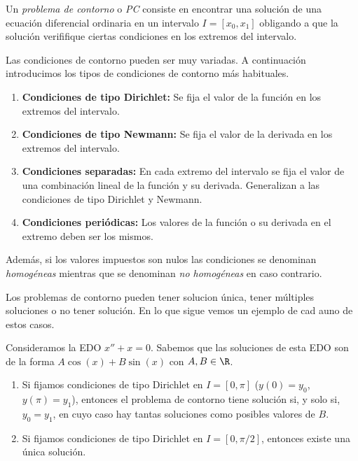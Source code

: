 \documentclass{article}
\begin{document}
\begin{definition}
  Un \emph{problema de contorno} o \emph{PC} consiste en encontrar una solución de una ecuación
  diferencial ordinaria en un intervalo $I = [x_0, x_1]$ obligando a que la solución verififique
  ciertas condiciones en los extremos del intervalo.
\end{definition}

Las condiciones de contorno pueden ser muy variadas. A continuación introducimos los tipos de
condiciones de contorno más habituales.

\begin{enumerate}
\item \textbf{Condiciones de tipo Dirichlet:} Se fija el valor de la función en los extremos del
  intervalo.
\item \textbf{Condiciones de tipo Newmann:} Se fija el valor de la derivada en los extremos del
  intervalo.
\item \textbf{Condiciones separadas:} En cada extremo del intervalo se fija el valor de una
  combinación lineal de la función y su derivada. Generalizan a las condiciones de tipo Dirichlet y
  Newmann.
\item \textbf{Condiciones periódicas:} Los valores de la función o su derivada en el extremo deben
  ser los mismos.
\end{enumerate}

Además, si los valores impuestos son nulos las condiciones se denominan \emph{homogéneas} mientras
que se denominan \emph{no homogéneas} en caso contrario.

Los problemas de contorno pueden tener solucion única, tener múltiples soluciones o no tener
solución.  En lo que sigue vemos un ejemplo de cad auno de estos casos.

\begin{ex} \label{ex:contorno} Consideramos la EDO $x'' + x = 0$. Sabemos que las soluciones de esta
  EDO son de la forma $A \cos(x) + B \sin(x)$ con $A,B \in \R$.
  
  \begin{enumerate}
  \item Si fijamos condiciones de tipo Dirichlet en $I = [0,\pi]$ ($y(0) = y_0$, $y(\pi) = y_1$),
    entonces el problema de contorno tiene solución si, y solo si, $y_0 = y_1$, en cuyo caso hay
    tantas soluciones como posibles valores de $B$.
  \item Si fijamos condiciones de tipo Dirichlet en $I = [0, \pi / 2]$, entonces existe una única
    solución.
  \end{enumerate}
\end{ex}
\end{document}
